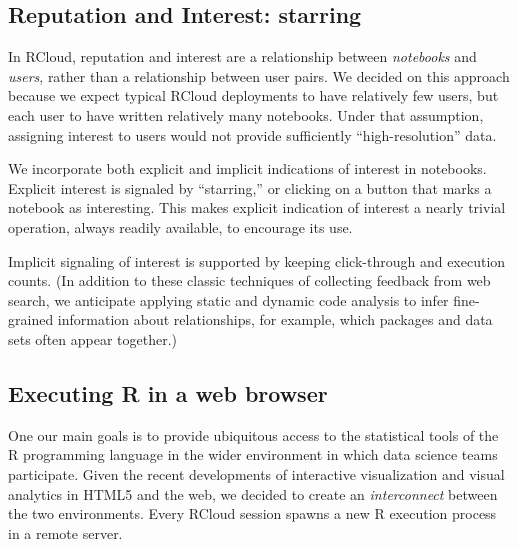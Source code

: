 
\subsection{Reputation and Interest: starring\label{sec:starring}}

In RCloud, reputation and interest are a relationship between
\emph{notebooks} and \emph{users}, rather than a relationship between
user pairs. We decided on this approach because we expect typical
RCloud deployments to have relatively few users, but each user to have
written relatively many notebooks. Under that assumption, assigning
interest to users would not provide sufficiently ``high-resolution'' data.

We incorporate both explicit and implicit indications of interest
in notebooks. Explicit interest is signaled by ``starring,'' or
clicking on a button that marks a notebook as interesting.
This makes explicit indication of interest a nearly trivial operation,
always readily available, to encourage its use.

Implicit signaling of interest is supported by keeping click-through
\cite{Joachims:2005:AIC} and execution counts. (In addition to these
classic techniques of collecting feedback from web search, we anticipate
applying static and dynamic code analysis to infer fine-grained
information about relationships, for example, which packages and data
sets often appear together.)

\subsection{Executing R in a web browser\label{sec:Rinbrowser}}

One our main goals is to provide ubiquitous access to the statistical
tools of the R programming language in the wider environment in which data
science teams participate.
%
Given the recent developments of interactive visualization and visual
analytics in HTML5 and the web, we decided to create an
\emph{interconnect} between the two environments.
%
Every RCloud session spawns a new R execution process in a remote
server.


